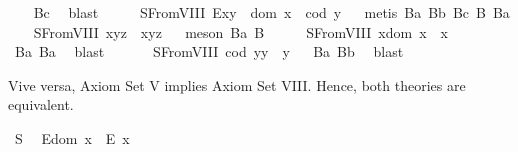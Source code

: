 \begin{isabellebody}
\isadelimproof
\ \ %
\endisadelimproof
%
\isatagproof
{}\isamarkupfalse%
\ B{}c\ \isamarkupfalse%
\ blast%
\endisatagproof
{\isafoldproof}%
%
\isadelimproof
%
\endisadelimproof
\ \isanewline
\ \ \isamarkupfalse%
\ S{}FromVIII{\isacharcolon}\ {\isachardoublequoteopen}E{\isacharparenleft}x{\isasymcdot}y{\isacharparenright}\ \isactrlbold {\isasymleftrightarrow}\ dom\ x\ {\isasymsimeq}\ cod\ y{\isachardoublequoteclose}%
\isadelimproof
\ %
\endisadelimproof
%
\isatagproof
{}\isamarkupfalse%
\ {\isacharparenleft}metis\ B{}a\ B{}b\ B{}c\ B{}\ B{}a{\isacharparenright}%
\endisatagproof
{\isafoldproof}%
%
\isadelimproof
%
\endisadelimproof
\isanewline
\ \ \isamarkupfalse%
\ S{}FromVIII{\isacharcolon}\ {\isachardoublequoteopen}x{\isasymcdot}{\isacharparenleft}y{\isasymcdot}z{\isacharparenright}\ {\isasymcong}\ {\isacharparenleft}x{\isasymcdot}y{\isacharparenright}{\isasymcdot}z{\isachardoublequoteclose}%
\isadelimproof
\ %
\endisadelimproof
%
\isatagproof
{}\isamarkupfalse%
\ {\isacharparenleft}meson\ B{}a\ B{}{\isacharparenright}%
\endisatagproof
{\isafoldproof}%
%
\isadelimproof
%
\endisadelimproof
\ \isanewline
\ \ \isamarkupfalse%
\ S{}FromVIII{\isacharcolon}\ {\isachardoublequoteopen}x{\isasymcdot}{\isacharparenleft}dom\ x{\isacharparenright}\ {\isasymcong}\ x{\isachardoublequoteclose}%
\isadelimproof
\ %
\endisadelimproof
%
\isatagproof
{}\isamarkupfalse%
\ B{}a\ B{}a\ \isamarkupfalse%
\ blast%
\endisatagproof
{\isafoldproof}%
%
\isadelimproof
%
\endisadelimproof
\ \ \isanewline
\ \ \isamarkupfalse%
\ S{}FromVIII{\isacharcolon}\ {\isachardoublequoteopen}{\isacharparenleft}cod\ y{\isacharparenright}{\isasymcdot}y\ {\isasymcong}\ y{\isachardoublequoteclose}%
\isadelimproof
\ %
\endisadelimproof
%
\isatagproof
{}\isamarkupfalse%
\ B{}a\ B{}b\ \isamarkupfalse%
\ blast%
\endisatagproof
{\isafoldproof}%
%
\isadelimproof
%
\endisadelimproof
%
\begin{isamarkuptext}%
Vive versa, Axiom Set V implies Axiom Set VIII. Hence, both theories are equivalent.%
\end{isamarkuptext}\isamarkuptrue%
\ S{}{\isacharcolon}\ %
\ {\isachardoublequoteopen}E{\isacharparenleft}dom\ x{\isacharparenright}\ \isactrlbold {\isasymrightarrow}\ E\ x{\isachardoublequoteclose}\ \isanewline

\end{isabellebody}
